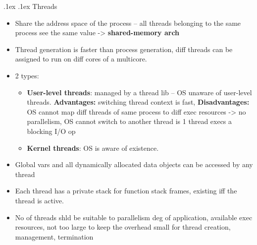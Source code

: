 \documentclass[10pt,landscape,a4paper]{article}
\makeatletter
\renewcommand{\subsubsection}{\@startsection{subsubsection}{1}{0mm}%
  {.1ex}%
  {.1ex}%
{\rmfamily\bfseries}}
\makeatother
\begin{document}
\begin{multicols*}{4}
  \subsubsection{Threads}
  \begin{itemize}
    \item Share the address space of the process -- all threads belonging to the same process see the same value -> \textbf{shared-memory arch}
    \item Thread generation is faster than process generation, diff threads can be assigned to run on diff cores of a multicore.
    \item 2 types:
          \begin{itemize}
            \item \textbf{User-level threads}: managed by a thread lib -- OS unaware of user-level threads. \textbf{Advantages:} switching thread context is fast, \textbf{Disadvantages:} OS cannot map diff threads of same process to diff exec resources -> no parallelism, OS cannot switch to another thread is 1 thread execs a blocking I/O op
            \item \textbf{Kernel threads}: OS is aware of existence.
          \end{itemize}
    \item Global vars and all dynamically allocated data objects can be accessed by any thread
    \item Each thread has a private stack for function stack frames, existing iff the thread is active.
    \item No of threads shld be suitable to parallelism deg of application, available exec resources, not too large to keep the overhead small for thread creation, management, termination
  \end{itemize}

\end{multicols*}
\end{document}
